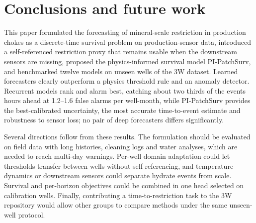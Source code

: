 \section{Conclusions and future work}\label{sec:conclusion}

This paper formulated the forecasting of mineral-scale restriction in production chokes as a discrete-time
survival problem on production-sensor data, introduced a self-referenced restriction proxy that remains
usable when the downstream sensors are missing, proposed the physics-informed survival model PI-PatchSurv,
and benchmarked twelve models on unseen wells of the 3W dataset. Learned forecasters clearly outperform a
physics threshold rule and an anomaly detector. Recurrent models rank and alarm best, catching about two
thirds of the events hours ahead at 1.2--1.6 false alarms per well-month, while PI-PatchSurv provides the
best-calibrated uncertainty, the most accurate time-to-event estimate and robustness to sensor loss; no pair
of deep forecasters differs significantly.

Several directions follow from these results. The formulation should be evaluated on field data with long
histories, cleaning logs and water analyses, which are needed to reach multi-day warnings. Per-well domain
adaptation could let thresholds transfer between wells without self-referencing, and temperature dynamics or
downstream sensors could separate hydrate events from scale. Survival and per-horizon objectives could be
combined in one head selected on calibration wells. Finally, contributing a time-to-restriction task to the
3W repository would allow other groups to compare methods under the same unseen-well protocol.
